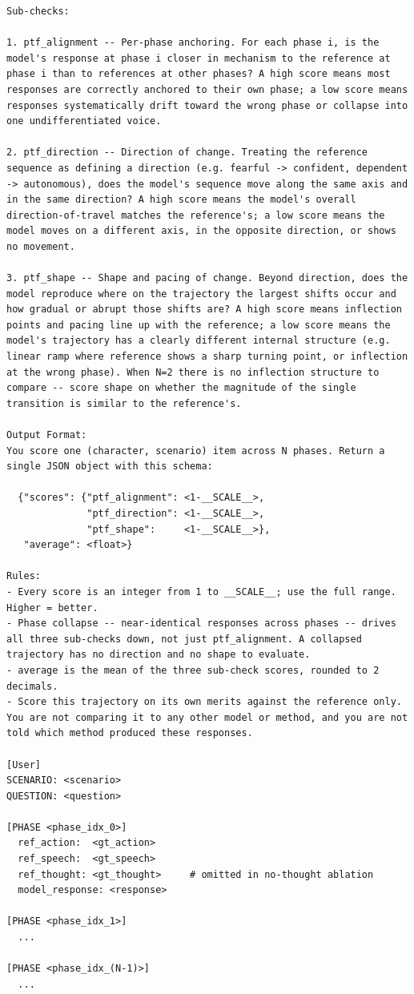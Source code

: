 \documentclass{llmxive}
\begin{document}
\begin{table}[htbp]
\begin{lstlisting}[basicstyle=\ttfamily\scriptsize]
Sub-checks:

1. ptf_alignment -- Per-phase anchoring. For each phase i, is the model's response at phase i closer in mechanism to the reference at phase i than to references at other phases? A high score means most responses are correctly anchored to their own phase; a low score means responses systematically drift toward the wrong phase or collapse into one undifferentiated voice.

2. ptf_direction -- Direction of change. Treating the reference sequence as defining a direction (e.g. fearful -> confident, dependent -> autonomous), does the model's sequence move along the same axis and in the same direction? A high score means the model's overall direction-of-travel matches the reference's; a low score means the model moves on a different axis, in the opposite direction, or shows no movement.

3. ptf_shape -- Shape and pacing of change. Beyond direction, does the model reproduce where on the trajectory the largest shifts occur and how gradual or abrupt those shifts are? A high score means inflection points and pacing line up with the reference; a low score means the model's trajectory has a clearly different internal structure (e.g. linear ramp where reference shows a sharp turning point, or inflection at the wrong phase). When N=2 there is no inflection structure to compare -- score shape on whether the magnitude of the single transition is similar to the reference's.

Output Format:
You score one (character, scenario) item across N phases. Return a single JSON object with this schema:

  {"scores": {"ptf_alignment": <1-__SCALE__>,
              "ptf_direction": <1-__SCALE__>,
              "ptf_shape":     <1-__SCALE__>},
   "average": <float>}

Rules:
- Every score is an integer from 1 to __SCALE__; use the full range. Higher = better.
- Phase collapse -- near-identical responses across phases -- drives all three sub-checks down, not just ptf_alignment. A collapsed trajectory has no direction and no shape to evaluate.
- average is the mean of the three sub-check scores, rounded to 2 decimals.
- Score this trajectory on its own merits against the reference only. You are not comparing it to any other model or method, and you are not told which method produced these responses.

[User]
SCENARIO: <scenario>
QUESTION: <question>

[PHASE <phase_idx_0>]
  ref_action:  <gt_action>
  ref_speech:  <gt_speech>
  ref_thought: <gt_thought>     # omitted in no-thought ablation
  model_response: <response>

[PHASE <phase_idx_1>]
  ...

[PHASE <phase_idx_(N-1)>]
  ...
\end{lstlisting}
\caption{Trajectory evaluator (PTF). \texttt{\_\_SCALE\_\_} is replaced with the score maximum (100 by default) at runtime.}
\label{tab:prompt-judge-trajectory}
\end{table}
\end{document}
